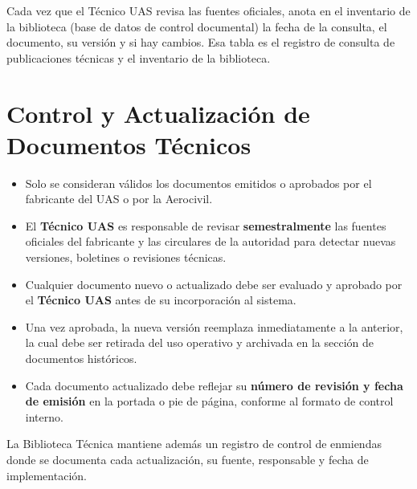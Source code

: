 Cada vez que el Técnico UAS revisa las fuentes oficiales, anota en el inventario de la biblioteca (base de datos de control documental) la fecha de la consulta, el documento, su versión y si hay cambios. Esa tabla es el registro de consulta de publicaciones técnicas y el inventario de la biblioteca.

\section{Control y Actualización de Documentos Técnicos}

\begin{itemize}
    \item Solo se consideran válidos los documentos emitidos o aprobados por el fabricante del UAS o por la Aerocivil.

    \item El \textbf{Técnico UAS} es responsable de revisar \textbf{semestralmente} las fuentes oficiales del fabricante y las circulares de la autoridad para detectar nuevas versiones, boletines o revisiones técnicas.

    \item Cualquier documento nuevo o actualizado debe ser evaluado y aprobado por el \textbf{Técnico UAS} antes de su incorporación al sistema.

    \item Una vez aprobada, la nueva versión reemplaza inmediatamente a la anterior, la cual debe ser retirada del uso operativo y archivada en la sección de documentos históricos.

    \item Cada documento actualizado debe reflejar su \textbf{número de revisión y fecha de emisión} en la portada o pie de página, conforme al formato de control interno.
\end{itemize}

La Biblioteca Técnica mantiene además un registro de control de enmiendas donde se documenta cada actualización, su fuente, responsable y fecha de implementación.

